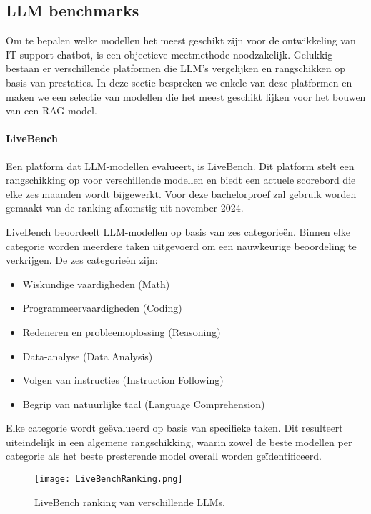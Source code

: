     
    \subsection{LLM benchmarks}
    Om te bepalen welke modellen het meest geschikt zijn voor de ontwikkeling van IT-support chatbot, is een objectieve meetmethode noodzakelijk. Gelukkig bestaan er verschillende platformen die LLM's vergelijken en rangschikken op basis van prestaties. In deze sectie bespreken we enkele van deze platformen en maken we een selectie van modellen die het meest geschikt lijken voor het bouwen van een RAG-model.
       
    \paragraph{LiveBench} 
    Een platform dat LLM-modellen evalueert, is LiveBench. Dit platform stelt een rangschikking op voor verschillende modellen en biedt een actuele scorebord die elke zes maanden wordt bijgewerkt. Voor deze bachelorproef zal gebruik worden gemaakt van de ranking afkomstig uit november 2024.
    
    LiveBench beoordeelt LLM-modellen op basis van zes categorieën. Binnen elke categorie worden meerdere taken uitgevoerd om een nauwkeurige beoordeling te verkrijgen. De zes categorieën zijn:
    \begin{itemize}
        \item Wiskundige vaardigheden (Math)
        \item Programmeervaardigheden (Coding)
        \item Redeneren en probleemoplossing (Reasoning)
        \item Data-analyse (Data Analysis)
        \item Volgen van instructies (Instruction Following)
        \item Begrip van natuurlijke taal (Language Comprehension)
    \end{itemize}
    
    Elke categorie wordt geëvalueerd op basis van specifieke taken. Dit resulteert uiteindelijk in een algemene rangschikking, waarin zowel de beste modellen per categorie als het beste presterende model overall worden geïdentificeerd.
    
    \begin{figure}[H]
        \centering
        \texttt{[image: LiveBenchRanking.png]}
        \caption{LiveBench ranking van verschillende LLMs.}
        \label{fig:livebench}
    \end{figure}
    
